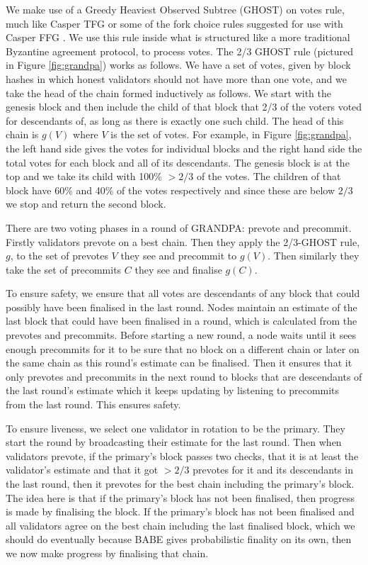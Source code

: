 We make use of a Greedy Heaviest Observed Subtree (GHOST) on votes rule, much like Casper TFG \cite{CasperTFG} or some of the fork choice rules suggested for use with Casper FFG \cite{CasperFFG}. We use this rule inside what is structured like a more traditional Byzantine agreement protocol, to process votes. The 2/3 GHOST rule (pictured in Figure \ref{fig:grandpa})  works as follows. We have a set of votes, given by block hashes in which honest validators should not have more than one vote, and we take the head of the chain formed inductively as follows. We start with the genesis block and then include the child of that block that 2/3 of the voters voted for descendants of, as long as there is exactly one such child. The head of this chain is $g(V)$ where $V$ is the set of votes. For example, in Figure \ref{fig:grandpa}, the left hand side gives the votes for individual blocks and the right hand side the total votes for each block and all of its descendants. The genesis block is at the top and we take its child with 100\% $> 2/3$ of the votes. The children of that block have 60\% and 40\% of the votes respectively and since these are below $2/3$ we stop and return the second block.

There are two voting phases in a round of GRANDPA: prevote and precommit. Firstly validators prevote on a best chain. Then they apply the 2/3-GHOST rule, $g$, to the set of prevotes $V$ they see and precommit to $g(V)$. Then similarly they take the set of precommits $C$ they see and finalise $g(C)$.

To ensure safety, we ensure that all votes are descendants of any block that could possibly have been finalised in the last round. Nodes maintain an estimate of the last block that could have been finalised in a round, which is calculated from the prevotes and precommits. Before starting a new round, a node waits until it sees enough precommits for it to be sure that no block on a different chain or later on the same chain as this round's estimate can be finalised. Then it ensures that it only prevotes and precommits in the next round to blocks that are descendants of the last round's estimate which it keeps updating by listening to precommits from the last round. This ensures safety.

To ensure liveness, we select one validator in rotation to be the primary. They start the round by broadcasting their estimate for the last round. Then when validators prevote, if the primary's block passes two checks, that it is at least the validator's estimate and that it got $>2/3$ prevotes for it and its descendants in the last round, then it prevotes for the best chain including the primary's block. The idea here is that if the primary's block has not been finalised, then progress is made by finalising the block. If the primary's block has not been finalised and all validators agree on the best chain including the last finalised block, which we should do eventually because BABE gives probabilistic finality on its own, then we now make progress by finalising that chain.
  



